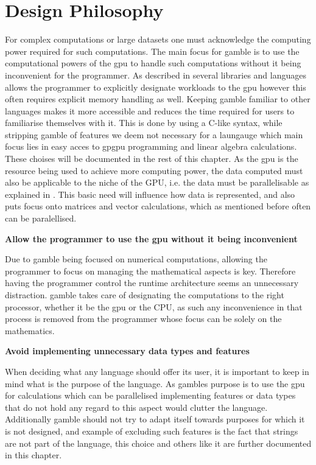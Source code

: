 \section{Design Philosophy}
For complex computations or large datasets one must acknowledge the computing power required for such computations.
The main focus for \gls{gamble} is to use the computational powers of the \acrshort{gpu} to handle such computations without it being inconvenient for the programmer.
As described in  several libraries and languages allows the programmer to explicitly designate workloads to the \acrshort{gpu} however this often requires explicit memory handling as well.
Keeping \gls{gamble} familiar to other languages makes it more accessible and reduces the time required for users to familiarise themselves with it.
This is done by using a C-like syntax, while stripping \gls{gamble} of features we deem not necessary for a laungauge which main focus lies in easy acces to \acrshort{gpgpu} programming and linear algebra calculations.
These choises will be documented in the rest of this chapter.
As the \acrshort{gpu} is the resource being used to achieve more computing power, the data computed must also be applicable to the niche of the GPU, i.e. the data must be parallelisable as explained in .
This basic need will influence how data is represented, and also puts focus onto matrices and vector calculations, which as mentioned before often can be paralellised.

\textbf{Allow the programmer to use the \acrshort{gpu} without it being inconvenient}

Due to \gls{gamble} being focused on numerical computations, allowing the programmer to focus on managing the mathematical aspects is key.
Therefore having the programmer control the runtime architecture seems an unnecessary distraction.
\gls{gamble} takes care of designating the computations to the right processor, whether it be the \acrshort{gpu} or the CPU, as such any inconvenience in that process is removed from the programmer whose focus can be solely on the mathematics.

\textbf{Avoid implementing unnecessary data types and features}

When deciding what any language should offer its user, it is important to keep in mind what is the purpose of the language.
As \glspl{gamble} purpose is to use the \acrshort{gpu} for calculations which can be parallelised implementing features or data types that do not hold any regard to this aspect would clutter the language.
Additionally \gls{gamble} should not try to adapt itself towards purposes for which it is not designed, and example of excluding such features is the fact that strings are not part of the language, this choice and others like it are further documented in this chapter.

